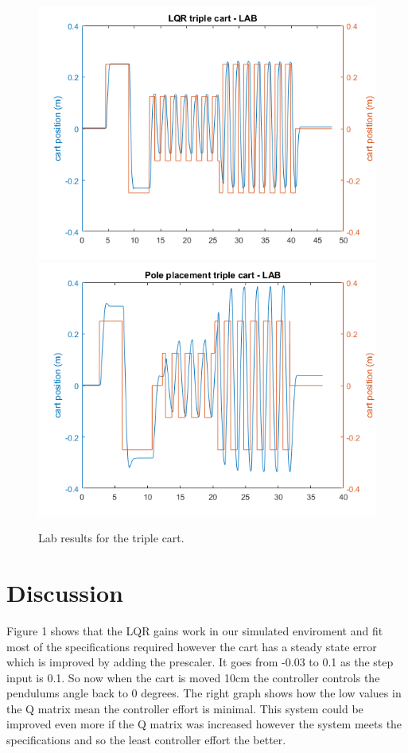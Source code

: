 \documentclass[a4paper,12pt]{article}
\begin{document}
\begin{figure}[h]
\centering
\includegraphics[scale=0.4]{lqr3cart-lab.png}
\includegraphics[scale=0.4]{pp3cart-lab.png}
\caption{Lab results for the triple cart.}
\end{figure}

\section{Discussion}
Figure 1 shows that the LQR gains work in our simulated enviroment and fit most of the specifications required however the cart has a steady state error which is improved by adding the prescaler. It goes from -0.03 to 0.1 as the step input is 0.1. So now when the cart is moved 10cm the controller controls the pendulums angle back to 0 degrees. The right graph shows how the low values in the Q matrix mean the controller effort is minimal. This system could be improved even more if the Q matrix was increased however the system meets the specifications and so the least controller effort the better.\\
\end{document}
